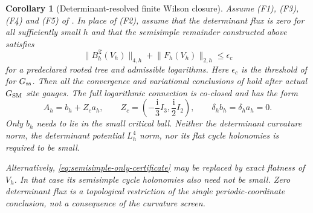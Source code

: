 \documentclass[11pt]{article}
\numberwithin{equation}{section}
\newtheorem{corollary}[corollary]{Corollary}
\theoremstyle{definition}
\theoremstyle{remark}
\newcommand{\ii}{\mathrm i}
\newcommand{\norm}[1]{\lVert#1\rVert}
\begin{document}
\begin{corollary}[Determinant-resolved finite Wilson closure]
\label{cor:determinant-resolved-closure}
Assume \textup{(F1)}, \textup{(F3)}, \textup{(F4)} and \textup{(F5)} of
.  In place of \textup{(F2)}, assume
that the determinant flux is zero for all sufficiently small $h$ and that
the semisimple remainder constructed above satisfies
\begin{equation}
 \norm{B_h^{\mathfrak T}(V_h)}_{4,h}
       +\norm{F_h(V_h)}_{2,h}\le\epsilon_c
 \label{eq:semisimple-only-certificate}
\end{equation}
for a predeclared rooted tree and admissible logarithms.  Here $\epsilon_c$
is the threshold of  for
$G_{\rm ss}$.  Then all the convergence and variational conclusions of
 hold after actual $G_{\rm SM}$ site
gauges.  The full logarithmic connection is co-closed and has the form
\begin{equation}
 A_h=b_h+Z_c a_h,\qquad
 Z_c=\left(-\frac{\ii}{3}I_3,\frac{\ii}{2}I_2\right),\qquad
 \delta_h b_h=\delta_h a_h=0.
 \label{eq:determinant-combined-connection}
\end{equation}
Only $b_h$ needs to lie in the small critical ball.  Neither the determinant
curvature norm, the determinant potential $L_h^4$ norm, nor its flat cycle
holonomies is required to be small.

Alternatively, \eqref{eq:semisimple-only-certificate} may be replaced by
exact flatness of $V_h$.  In that case its semisimple cycle holonomies also
need not be small.  Zero determinant flux is a topological restriction of
the single periodic-coordinate conclusion, not a consequence of the
curvature screen.
\end{corollary}
\end{document}
